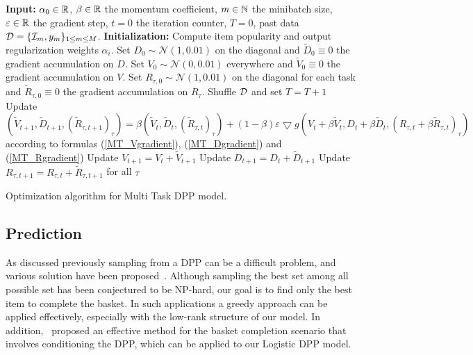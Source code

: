 \begin{algorithm}[t]
\begin{algorithmic}
\STATE \textbf{Input:} $\alpha_0 \in \mathbb{R}$, $\beta \in \mathbb{R}$ the momentum coefficient, $m \in \mathbb{N}$ the minibatch size, $\varepsilon \in \mathbb{R}$ the gradient step, $t=0$ the iteration counter, $T=0$, past data $\mathcal{D} = \{\mathcal{I}_m,y_m\}_{1 \leq m \leq M}$.
\STATE \textbf{Initialization:} Compute item popularity and output regularization weights $\alpha_i$. 
\STATE Set $D_0 \sim \mathcal{N}(1,0.01)$ on the diagonal and $\tilde{D}_0 \equiv 0$ the gradient accumulation on $D$.
\STATE Set $V_0 \sim \mathcal{N}(0,0.01)$ everywhere and $\tilde{V}_0 \equiv 0$ the gradient accumulation on $V$.
\STATE Set $R_{\tau,0} \sim \mathcal{N}(1,0.01)$ on the diagonal for each task and $\tilde{R}_{\tau,0} \equiv 0$ the gradient accumulation on $R_{\tau}$.
\STATE Shuffle $\mathcal{D}$ and set $T = T +1 $
\ENDIF 
\STATE Update $\left(\tilde{V}_{t+1}, \tilde{D}_{t+1}, (\tilde{R}_{\tau,t+1})_{\tau}\right) = \beta \left(\tilde{V}_t,\tilde{D}_t,(\tilde{R}_{\tau,t})_{\tau} \right) + (1-\beta) \varepsilon \bigtriangledown g(V_t+\beta \tilde{V}_t, D_t+\beta \tilde{D}_t, (R_{\tau,t}+\beta \tilde{R}_{\tau,t})_{\tau})$ according to formulas (\ref{MT_Vgradient}), (\ref{MT_Dgradient}) and (\ref{MT_Rgradient})
\STATE Update $V_{t+1} = V_t + \tilde{V}_{t+1}$
\STATE Update $D_{t+1} = D_t + \tilde{D}_{t+1}$ 
\STATE Update $R_{\tau,t+1} = R_{\tau,t} + \tilde{R}_{\tau,t+1}$ for all $\tau$ 
\ENDWHILE
\end{algorithmic}
\caption{Optimization algorithm for Multi Task DPP model.}
\label{alg:multitask}
\end{algorithm}

\subsection{Prediction}
As discussed previously sampling from a DPP can be a difficult problem, and
various solution have been
proposed~\cite{DBLP:journals/corr/HanKPS17,NIPS2014_5564,DBLP:conf/icml/GautierBV17,DBLP:journals/corr/abs-1709-05135}.
Although sampling the best set among all possible set has been conjectured to be
NP-hard, our goal is to find only the best item to complete the basket. In such
applications a greedy approach can be applied effectively, especially with the
low-rank structure of our model. In addition,~\cite{DBLP:conf/aaai/GartrellPK17}
proposed an effective method for the basket completion scenario that involves
conditioning the DPP, which can be applied to our Logistic DPP model. 